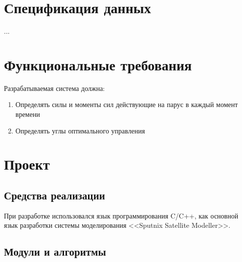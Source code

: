 \section{Спецификация данных}
...
\section{Функциональные требования}
\noindent\indent Разрабатываемая система должна:
\begin{enumerate}
  \item Определять силы и моменты сил действующие на парус в каждый момент времени
  \item Определять углы оптимального управления
\end{enumerate}
\section{Проект}
\subsection{Средства реализации}
\noindent\indent При разработке использовался язык программирования C/C++,
как основной язык разработки системы моделирования <<Sputnix Satellite Modeller>>.
\subsection{Модули и алгоритмы}

